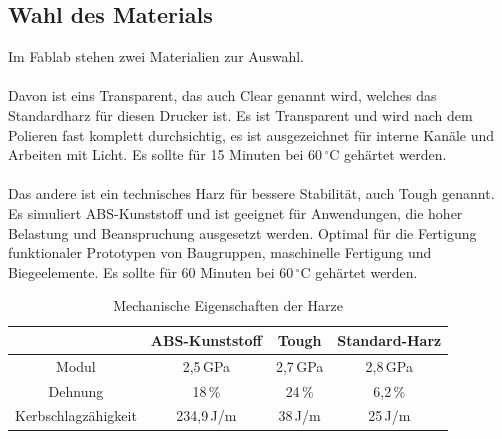\documentclass{\basedir/fablab-document}
\begin{document}
\subsection{Wahl des Materials}

Im Fablab stehen zwei Materialien zur Auswahl.\\
\\
Davon ist eins Transparent, das auch Clear genannt wird, welches das Standardharz für diesen Drucker ist. Es ist Transparent und wird nach dem Polieren fast komplett durchsichtig, es ist ausgezeichnet für interne Kanäle und Arbeiten mit Licht. Es sollte für 15 Minuten bei 60\,$^\circ$C gehärtet werden.\\
\\
Das andere ist ein technisches Harz für bessere Stabilität, auch Tough genannt. Es simuliert ABS-Kunststoff und ist geeignet für Anwendungen, die hoher Belastung und Beanspruchung ausgesetzt werden. Optimal für die Fertigung funktionaler Prototypen von Baugruppen, maschinelle Fertigung und Biegeelemente. Es sollte für 60 Minuten bei 60\,$^\circ$C gehärtet werden.

\begin{table} [H]
	\centering
	\begin{tabular}{|c||c|c|c|}\hline
		 & ABS-Kunststoff & Tough & Standard-Harz\\ \hline\hline
		Modul & 2,5\,GPa & 2,7\,GPa & 2,8\,GPa \\ \hline
		Dehnung & 18\,\% & 24\,\% &  6,2\,\%\\ \hline
		Kerbschlagzähigkeit & 234,9\,J/m & 38\,J/m & 25\,J/m \\ \hline
	\end{tabular}
	\caption{Mechanische Eigenschaften der Harze}
	\label{table:MechEigenschaften}
\end{table}
\end{document}
